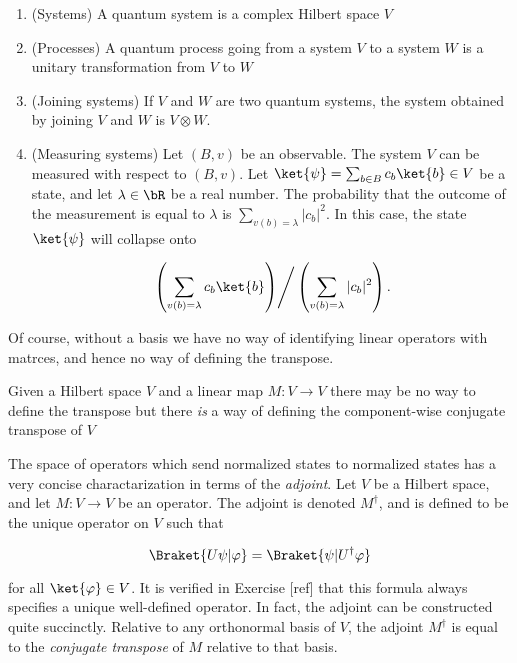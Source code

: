 \begin{defn} $\,$

\begin{enumerate}
\item (Systems) A quantum system is a complex Hilbert space $V$
\item (Processes) A quantum process going from a system $V$ to a system $W$ is a unitary transformation from $V$ to $W$
\item (Joining systems) If $V$ and $W$ are two quantum systems, the system obtained by joining $V$ and $W$ is $V\otimes W$.
\item (Measuring systems) Let $(B,v)$ be an observable. The system $V$ can be measured with respect to $(B,v)$. Let $\ket{\psi}=\sum_{b\in B}c_b \ket{b}\in V$ be a state, and let $\lambda\in \bR$ be a real number. The probability that the outcome of the measurement is equal to $\lambda$ is $\sum_{v(b)=\lambda}|c_b|^2$. In this case, the state $\ket{\psi}$ will collapse onto

$$\left.\left(\sum_{v(b)=\lambda}c_b \ket{b}\right)\right/ \left(\sum_{v(b)=\lambda}|c_b|^2\right).$$
\end{enumerate}
\end{defn}

 Of course, without a basis we have no way of identifying linear operators with matrces, and hence no way of defining the transpose. 

Given a Hilbert space $V$ and a linear map $M:V\to V$ there may be no way to define the transpose but there {\em is} a way of defining the component-wise conjugate transpose of $V$

\begin{rem}
The space of operators which send normalized states to normalized states has a very concise charactarization in terms of the {\em adjoint}. Let $V$ be a Hilbert space, and let $M:V\to V$ be an operator. The adjoint is denoted $M^\dagger$, and is defined to be the unique operator on $V$ such that

$$\Braket{ U \psi  | \varphi}=\Braket{\psi | U^\dagger \varphi}$$

for all $\ket{\varphi}\in V$. It is verified in Exercise [ref] that this formula always specifies a unique well-defined operator. In fact, the adjoint can be constructed quite succinctly. Relative to any orthonormal basis of $V$, the adjoint $M^\dagger$ is equal to the {\em conjugate transpose} of $M$ relative to that basis.
\end{rem}

